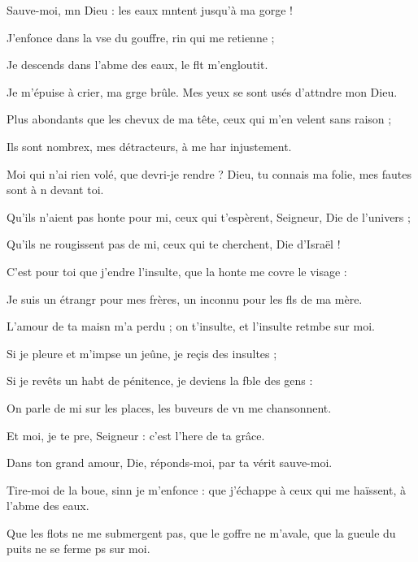 \item Sauve-moi, mn Dieu : les eaux mntent jusqu’à ma gorge !
\item J’enfonce dans la vse du gouffre, rin qui me retienne ; 
\item Je descends dans l’abme des eaux, le flt m’engloutit.
\item Je m’épuise à crier, ma grge brûle. Mes yeux se sont usés d’attndre mon Dieu.
\item Plus abondants que les chevux de ma tête, ceux qui m’en velent sans raison ;
\item Ils sont nombrex, mes détracteurs, à me har injustement. 
\item Moi qui n’ai rien volé, que devri-je rendre ? Dieu, tu connais ma folie, mes fautes sont à n devant toi.
\item Qu’ils n’aient pas honte pour mi, ceux qui t’espèrent, Seigneur, Die de l’univers ;
\item Qu’ils ne rougissent pas de mi, ceux qui te cherchent, Die d’Israël !
\item C’est pour toi que j’endre l’insulte, que la honte me covre le visage :
\item Je suis un étrangr pour mes frères, un inconnu pour les fls de ma mère.
\item L’amour de ta maisn m’a perdu ; on t’insulte, et l’insulte retmbe sur moi.
\item Si je pleure et m’impse un jeûne, je reçis des insultes ;
\item Si je revêts un habt de pénitence, je deviens la fble des gens :
\item On parle de mi sur les places, les buveurs de vn me chansonnent.
\item Et moi, je te pre, Seigneur : c’est l’here de ta grâce.
\item Dans ton grand amour, Die, réponds-moi, par ta vérit sauve-moi.
\item Tire-moi de la boue, sinn je m’enfonce : que j’échappe à ceux qui me haïssent, à l’abme des eaux.
\item Que les flots ne me submergent pas, que le goffre ne m’avale, que la gueule du puits ne se ferme ps sur moi.